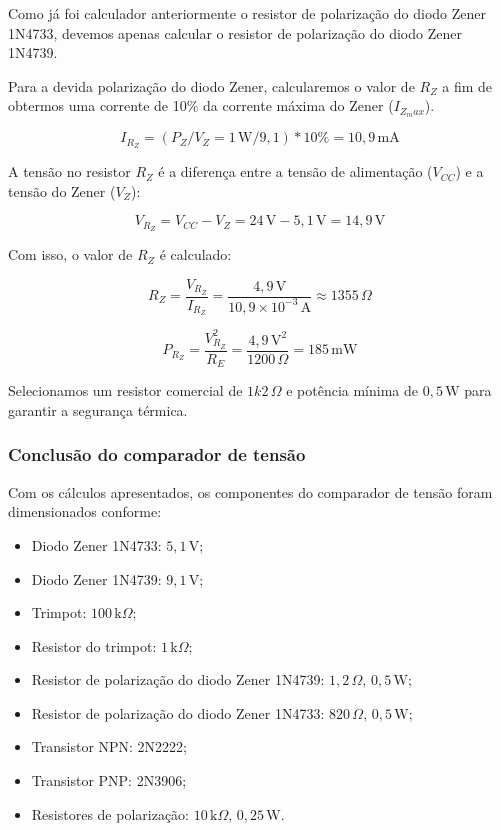 Como já foi calculador anteriormente o resistor de polarização do diodo Zener 1N4733, devemos apenas calcular o resistor de polarização do diodo Zener 1N4739.

Para a devida polarização do diodo Zener, calcularemos o valor de \(R_Z\) a fim de obtermos uma corrente de 10\% da corrente máxima do Zener (\(I_{Z_max}\)).

\[
I_{R_Z} = (P_Z / V_Z = 1 \, \text{W} / 9,1) * 10\% = 10,9 \, \text{mA}
\]

A tensão no resistor \(R_Z\) é a diferença entre a tensão de alimentação (\(V_{CC}\)) e a tensão do Zener (\(V_Z\)):  

\[
V_{R_Z} = V_{CC} - V_Z = 24 \, \text{V} - 5,1 \, \text{V} = 14,9 \, \text{V}
\]

Com isso, o valor de \(R_Z\) é calculado:  

\[
R_Z = \frac{V_{R_Z}}{I_{R_Z}} = \frac{4,9 \, \text{V}}{10,9 \times 10^{-3} \, \text{A}} \approx 1355 \, \Omega
\]

\[
P_{R_Z} = \frac{V_{R_Z}^2}{R_E} = \frac{4,9 \, \text{V}^2}{1200 \, \Omega} = 185 \, \text{mW}
\]

Selecionamos um resistor comercial de \(1k2 \, \Omega\) e potência mínima de \(0,5 \, \text{W}\) para garantir a segurança térmica.

\subsubsection*{Conclusão do comparador de tensão}

Com os cálculos apresentados, os componentes do comparador de tensão foram dimensionados conforme:

\begin{itemize}
    \item Diodo Zener 1N4733: \( 5,1 \, \text{V} \);
    \item Diodo Zener 1N4739: \( 9,1 \, \text{V} \);
    \item Trimpot: \( 100 \, \text{k}\Omega \);
    \item Resistor do trimpot: \( 1 \, \text{k}\Omega \);
    \item Resistor de polarização do diodo Zener 1N4739: \( 1{,}2 \, \Omega, \, 0{,}5 \, \text{W} \);
    \item Resistor de polarização do diodo Zener 1N4733: \( 820 \, \Omega, \, 0{,}5 \, \text{W} \);
    \item Transistor NPN: 2N2222;
    \item Transistor PNP: 2N3906;
    \item Resistores de polarização: \( 10 \, \text{k}\Omega, \, 0{,}25 \, \text{W} \).
\end{itemize}

